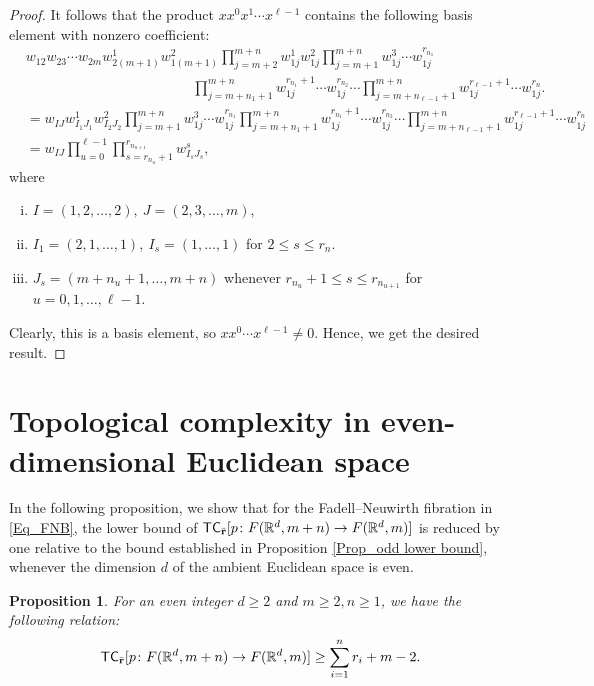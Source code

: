 \documentclass[12pt,oneside,reqno]{amsart}
\theoremstyle{plain}
\newtheorem{proposition}[theorem]{Proposition}
\theoremstyle{definition}
\theoremstyle{remark}
\newcommand{\sect}{\setcounter{figure}{0}\section}
\newcommand{\TC}{{\sf {TC}}}
\newcommand{\br}{\bar{\mathbf{r}}}
\begin{document}
\begin{proof}
It follows that the product $x x^0 x^1 \cdots x^{\ell-1}$ contains the following basis element with nonzero coefficient: 
\begin{align*}
& w_{12} w_{23}\cdots w_{2m} w^1_{2(m+1)} w^2_{1(m+1)}\prod^{m+n}_{j=m+2} w^1_{1j} w^2_{1j} \prod^{m+n}_{j=m+1} w^3_{1j}\cdots w^{r_{n_1}}_{1j} \\&\hspace{5cm}\prod^{m+n}_{j=m+n_1+1} w^{r_{n_1}+1}_{1j} \cdots w^{r_{n_2}}_{1j} \cdots \prod^{m+n}_{j=m+n_{\ell-1}+1} w^{r_{\ell-1}+1}_{1j}\cdots w^{r_n}_{1j}.\\
& = w_{IJ}w^1_{I_1J_1}w^2_{I_2J_2}\prod^{m+n}_{j=m+1} w^3_{1j}\cdots w^{r_{n_1}}_{1j} \prod^{m+n}_{j=m+n_1+1} w^{r_{n_1}+1}_{1j} \cdots w^{r_{n_2}}_{1j} \cdots \prod^{m+n}_{j=m+n_{\ell-1}+1} w^{r_{\ell-1}+1}_{1j}\cdots w^{r_n}_{1j}\\
& = w_{IJ} \prod^{\ell-1}_{u=0} \prod^{r_{n_{u+1}}}_{s = r_{n_{u}}+1} w^s_{I_sJ_s},
\end{align*}
where 
\begin{enumerate}[(i)]
\item $I= (1,2,\ldots,2), ~J=(2,3,\ldots,m)$,
\item  $I_1=(2,1, \ldots,1), ~I_s = (1,\ldots,1)$ for $2\leq s\leq r_n$. 
\item $J_s = (m + n_u + 1, \ldots, m + n)$ whenever $r_{n_u}+1\leq s\leq r_{n_{u+1}}$ for $u = 0,1,\ldots, \ell-1$. 
\end{enumerate}
Clearly, this is a basis element, so $x x^0 \cdots x^{\ell-1}\neq 0$. Hence, we get the desired result.
\end{proof}



\sect{Topological complexity in even-dimensional Euclidean space}\label{sec:even}
 
In the following proposition, we show that for the Fadell–Neuwirth fibration in \eqref{Eq_FNB}, the lower bound of $\TC_{\br}[p\colon F(\mathbb{R}^d, m+n)\to F(\mathbb{R}^d, m)]$ is reduced by one relative to the bound established in Proposition \ref{Prop_odd lower bound}, whenever the dimension $d$ of the ambient Euclidean space is even. 


\begin{proposition}\label{proposition lower bound even case}
For an even integer $d\geq 2$ and $m\geq 2, n\geq 1$, we have the following relation:
$$\TC_{\br}[p \colon F(\mathbb{R}^d, m+n)\to F(\mathbb{R}^d, m)] \geq \displaystyle\sum^{n}_{i=1} {r_i} + m -2.$$
\end{proposition}
\end{document}
